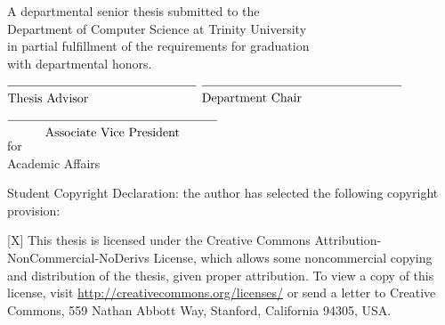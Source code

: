 \begin{singlespace}

\begin{center}

\textbf{\theTitle} 

\vspace*{\baselineskip}

\theAuthor 

\vspace*{\baselineskip}

A departmental senior thesis submitted to the \\
Department of Computer Science at Trinity University \\
in partial fulfillment of the requirements for graduation \\
with departmental honors. 

\vspace*{\baselineskip}

\theDate

\vfill

$\overline{\mbox{\rule{0in}{0.16in}Thesis Advisor~~~~~~~~~~~~~~~~~~~~~~~~~~}}$ 
\hfill
$\overline{\mbox{\rule{0in}{0.16in}Department Chair~~~~~~~~~~~~~~~~~~~~~~~~}}$ 

\vspace*{2\baselineskip}

$\overline{\mbox{\rule{0in}{0.16in}
~~~~~~~~Associate Vice President~~~~~~~~
}}$ \\
for \\
Academic Affairs

\end{center}

\vfill

\begin{small}

\settowidth{\WidthOfX}{X}

\noindent
Student Copyright Declaration: the author has selected the following
copyright provision:

\begin{TitlePageList}
\item{[X]}
This thesis is licensed under the
Creative Commons Attribution-NonCommercial-NoDerivs License, which
allows some noncommercial copying and distribution of the thesis,
given proper attribution.  To view a copy of this license, visit
\url{http://creativecommons.org/licenses/} or send a letter to Creative
Commons, 559 Nathan Abbott Way, Stanford, California 94305, USA.


\end{TitlePageList}
\end{small}
\end{singlespace}

